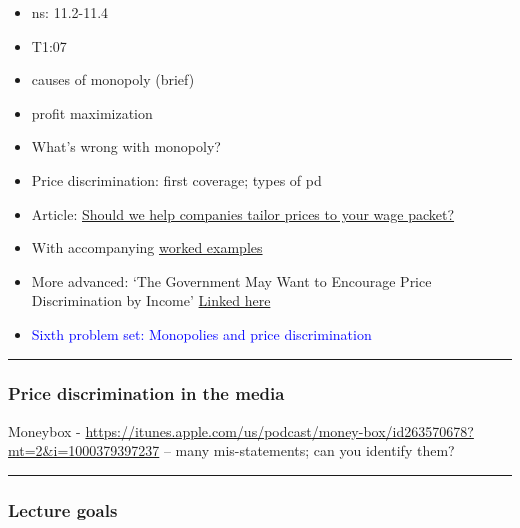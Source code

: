 \documentclass[]{article}
\begin{document}
\begin{itemize}
\item
  ns: 11.2-11.4
\item
  T1:07
\item
  causes of monopoly (brief)
\item
  profit maximization
\item
  What's wrong with monopoly?
\item
  Price discrimination: first coverage; types of pd
\item
  Article: \href{https://theconversation.com/should-we-help-companies-tailor-prices-to-your-wage-packet-47719}{Should we help companies tailor prices to your wage packet?}
\item
  With accompanying \href{https://docs.google.com/document/d/16jos_PT9w1wGpyD5A8ZiWJ9HW6kaLOJH6EWc_AYWnkk/pub}{worked examples}
\item
  More advanced: `The Government May Want to Encourage Price Discrimination by Income' \href{https://davidreinstein.wordpress.com/research-and-publications/}{Linked here}
\item
  \textcolor{blue}{Sixth problem set: Monopolies and price discrimination}
\end{itemize}

\begin{center}\rule{0.5\linewidth}{\linethickness}\end{center}

\hypertarget{price-discrimination-in-the-media}{%
\subsubsection{Price discrimination in the media}\label{price-discrimination-in-the-media}}

Moneybox - \url{https://itunes.apple.com/us/podcast/money-box/id263570678?mt=2&i=1000379397237} -- many mis-statements; can you identify them?

\begin{center}\rule{0.5\linewidth}{\linethickness}\end{center}

\hypertarget{lecture-goals}{%
\subsubsection{Lecture goals}\label{lecture-goals}}
\end{document}
